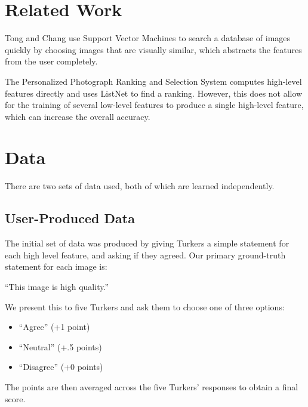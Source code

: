 \documentclass[11pt,letter]{article}
\begin{document}
\begin{figure*}[h!]
  \centering
  \caption{This is what Turkers see when rating the image. Here, there are two high level features: blur quality and exposure quality. 
That are determined by two last statements on the right.
The first statement (``This image is high quality'') is the ground truth. See Section \ref{turkdata} for details.}
  \label{fig:turkexample}
\end{figure*}

\section{Related Work}
Tong and Chang\cite{Tong:2001:SVM:500141.500159} use Support Vector Machines to search a database of images quickly by choosing images that are visually similar, which abstracts the features from the user completely.

The Personalized Photograph Ranking and Selection System\cite{Yeh:2010:PPR:1873951.1873963} computes high-level features directly and uses ListNet\cite{Cao:2007:LRP:1273496.1273513} to find a ranking. However, this does not allow for the training of several low-level features to produce a single high-level feature, which can increase the overall accuracy.

\section{Data}

There are two sets of data used, both of which are learned independently.

\subsection{User-Produced Data}
\label{turkdata}
The initial set of data was produced by giving Turkers a simple statement for each high level feature, and asking if they agreed. Our primary ground-truth statement for each image is:

``This image is high quality.''

We present this to five Turkers and ask them to choose one of three options:

\begin{itemize}
\item ``Agree'' (+1 point)
\item ``Neutral'' (+.5 points)
\item ``Disagree'' (+0 points)
\end{itemize}
The points are then averaged across the five Turkers' responses to obtain a final score.
\end{document}
